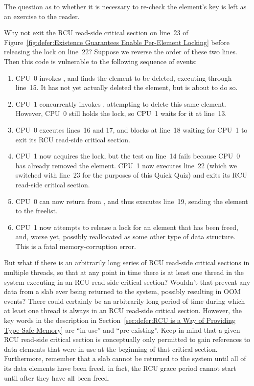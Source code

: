 	The question as to whether it is necessary to re-check the
	element's key is left as an exercise to the reader.

\QuickQ{}
	Why not exit the RCU read-side critical section on
	line~23 of
	Figure~\ref{fig:defer:Existence Guarantees Enable Per-Element Locking}
	before releasing the lock on line~22?
\QuickA{}
	Suppose we reverse the order of these two lines.
	Then this code is vulnerable to the following sequence of
	events:
	\begin{enumerate}
	\item	CPU~0 invokes , and finds the element
		to be deleted, executing through line~15.
		It has not yet actually deleted the element, but
		is about to do so.
	\item	CPU~1 concurrently invokes , attempting
		to delete this same element.
		However, CPU~0 still holds the lock, so CPU~1 waits
		for it at line~13.
	\item	CPU~0 executes lines~16 and 17, and blocks at
		line~18 waiting for CPU~1 to exit its RCU read-side
		critical section.
	\item	CPU~1 now acquires the lock, but the test on line~14
		fails because CPU~0 has already removed the element.
		CPU~1 now executes line~22 (which we switched with line~23
		for the purposes of this Quick Quiz)
		and exits its RCU read-side critical section.
	\item	CPU~0 can now return from ,
		and thus executes line~19, sending the element to
		the freelist.
	\item	CPU~1 now attempts to release a lock for an element
		that has been freed, and, worse yet, possibly
		reallocated as some other type of data structure.
		This is a fatal memory-corruption error.
	\end{enumerate}

\QuickQ{}
	But what if there is an arbitrarily long series of RCU
	read-side critical sections in multiple threads, so that at
	any point in time there is at least one thread in the system
	executing in an RCU read-side critical section?
	Wouldn't that prevent any data from a 
	slab ever being returned to the system, possibly resulting
	in OOM events?
\QuickA{}
	There could certainly be an arbitrarily long period of time
	during which at least one thread is always in an RCU read-side
	critical section.
	However, the key words in the description in
	Section~\ref{sec:defer:RCU is a Way of Providing Type-Safe Memory}
	are ``in-use'' and ``pre-existing''.
	Keep in mind that a given RCU read-side critical section is
	conceptually only permitted to gain references to data elements
	that were in use at the beginning of that critical section.
	Furthermore, remember that a slab cannot be returned to the
	system until all of its data elements have been freed, in fact,
	the RCU grace period cannot start until after they have all been
	freed.

